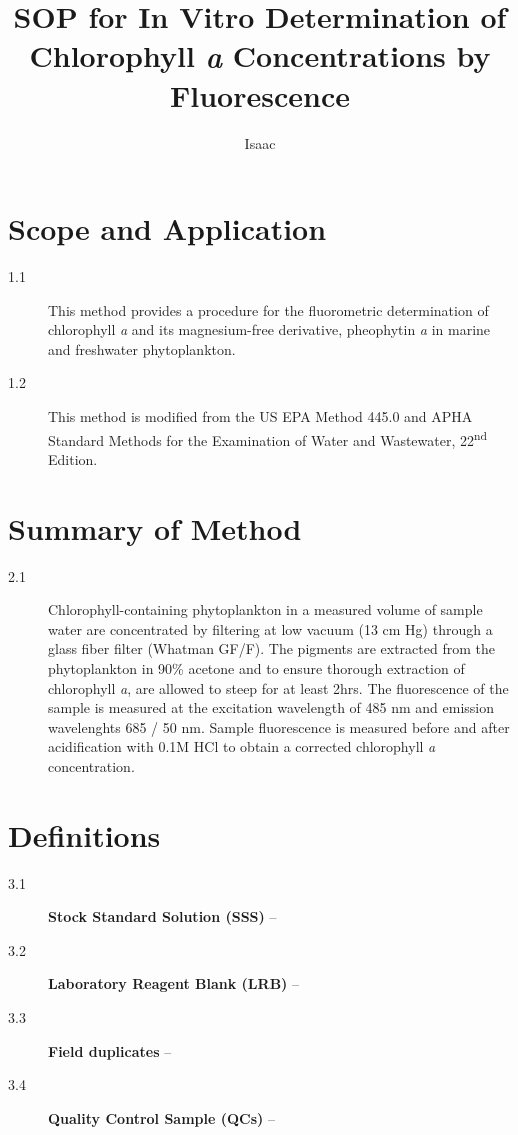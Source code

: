 \documentclass{article}
\author{Isaac}
\title{SOP for In Vitro Determination of Chlorophyll \textit{a} Concentrations by Fluorescence}
\begin{document}

\maketitle

\section{Scope and Application}
\begin{description}
  \item[1.1] This method provides a procedure for the fluorometric determination of chlorophyll \textit{a} and its magnesium-free derivative, pheophytin \textit{a} in marine and freshwater phytoplankton.
  \item[1.2] This method is modified from the US EPA Method 445.0 and APHA Standard Methods for the Examination of Water and Wastewater, 22\textsuperscript{nd} Edition. 
\end{description}

\section{Summary of Method}
\begin{description}
  \item[2.1] Chlorophyll-containing phytoplankton in a measured volume of sample water are concentrated by filtering at low vacuum (13 cm Hg) through a glass fiber filter (Whatman GF/F). The pigments are extracted from the phytoplankton in 90\% acetone and to ensure thorough extraction of chlorophyll \textit{a}, are allowed to steep for at least 2hrs. The fluorescence of the sample is measured at the excitation wavelength of 485 nm and emission wavelenghts 685 / 50 nm. Sample fluorescence is measured before and after acidification with 0.1M HCl to obtain a corrected chlorophyll \textit{a} concentration. 
\end{description}

\section{Definitions}
\begin{description}
\item[3.1] \textbf{Stock Standard Solution (SSS)} --
\item[3.2] \textbf{Laboratory Reagent Blank (LRB)} --
\item[3.3] \textbf{Field duplicates} --
\item[3.4] \textbf{Quality Control Sample (QCs)} --
\end{description}
\end{document}
